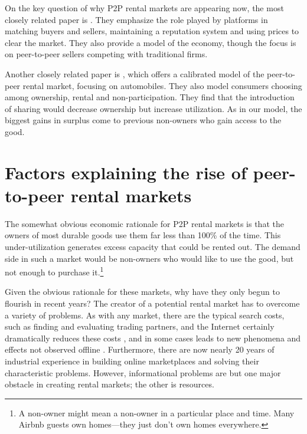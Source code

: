 \documentclass[12pt]{article}
\begin{document}
On the key question of why P2P rental markets are appearing now, the most closely related paper is \cite{einav2015peer}. 
They emphasize the role played by platforms in matching buyers and sellers, maintaining a reputation system and using prices to clear the market.
They also provide a model of the economy, though the focus is on peer-to-peer sellers competing with traditional firms. 

Another closely related paper is \cite{frailberger2015}, which offers a calibrated model of the peer-to-peer rental market, focusing on automobiles.
They also model consumers choosing among ownership, rental and non-participation.
They find that the introduction of sharing would decrease ownership but increase utilization.
As in our model, the biggest gains in surplus come to previous non-owners who gain access to the good. 

\section{Factors explaining the rise of peer-to-peer rental markets}

The somewhat obvious economic rationale for P2P rental markets is that the owners of most durable goods use them far less than 100\% of the time.
This under-utilization generates excess capacity that could be rented out.
The demand side in such a market would be non-owners who would like to use the good, but not enough to purchase it.\footnote{
A non-owner might mean a non-owner in a particular place and time. 
Many Airbnb guests own homes---they just don't own homes everywhere. 
} 

Given the obvious rationale for these markets, why have they only begun to flourish in recent years? 
The creator of a potential rental market has to overcome a variety of problems. 
As with any market, there are the typical search costs, such as finding and evaluating trading partners, and the Internet certainly dramatically reduces these costs \citep{bakos1997reducing}, and in some cases leads to new phenomena and effects not observed offline \citep{overby2015}.
Furthermore, there are now nearly 20 years of industrial experience in building online marketplaces and solving their characteristic problems. 
However, informational problems are but one major obstacle in creating rental markets; the other is resources. 
\end{document}
